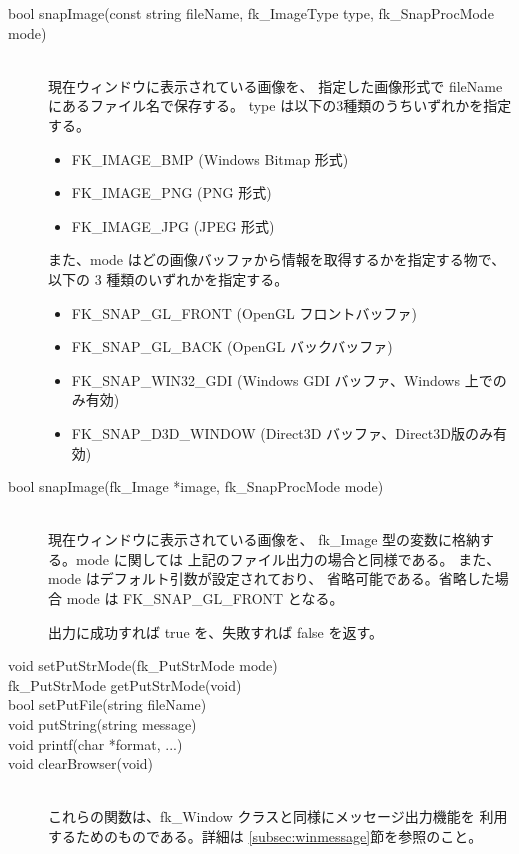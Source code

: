 \begin{description}
 \item[\hspace*{0.6cm}bool snapImage(const string fileName,
			fk\_ImageType type,
			fk\_SnapProcMode mode)] ~ \\
	現在ウィンドウに表示されている画像を、
	指定した画像形式で fileName にあるファイル名で保存する。
	type は以下の3種類のうちいずれかを指定する。
	\begin{itemize}
	 \item FK\_IMAGE\_BMP (Windows Bitmap 形式)
	 \item FK\_IMAGE\_PNG (PNG 形式)
	 \item FK\_IMAGE\_JPG (JPEG 形式)
	\end{itemize}
	また、mode はどの画像バッファから情報を取得するかを指定する物で、
	以下の 3 種類のいずれかを指定する。
	\begin{itemize}
	 \item FK\_SNAP\_GL\_FRONT (OpenGL フロントバッファ)
	 \item FK\_SNAP\_GL\_BACK (OpenGL バックバッファ)
	 \item FK\_SNAP\_WIN32\_GDI
	 (Windows GDI バッファ、Windows 上でのみ有効)
	 \item FK\_SNAP\_D3D\_WINDOW
	(Direct3D バッファ、Direct3D版のみ有効)
	\end{itemize}

 \item[\hspace*{0.6cm}bool snapImage(fk\_Image *image,
				fk\_SnapProcMode mode)] ~ \\
	現在ウィンドウに表示されている画像を、
	fk\_Image 型の変数に格納する。mode に関しては
	上記のファイル出力の場合と同様である。
	また、mode はデフォルト引数が設定されており、
	省略可能である。省略した場合 mode は FK\_SNAP\_GL\_FRONT となる。

	出力に成功すれば true を、失敗すれば false を返す。
 \item[\hspace*{0.6cm}void setPutStrMode(fk\_PutStrMode mode)]
 \item[\hspace*{0.6cm}fk\_PutStrMode getPutStrMode(void)]
 \item[\hspace*{0.6cm}bool setPutFile(string fileName)]
 \item[\hspace*{0.6cm}void putString(string message)]
 \item[\hspace*{0.6cm}void printf(char *format, ...)]
 \item[\hspace*{0.6cm}void clearBrowser(void)] ~ \\
	これらの関数は、fk\_Window クラスと同様にメッセージ出力機能を
	利用するためのものである。詳細は \ref{subsec:winmessage}節を参照のこと。

\end{description}
